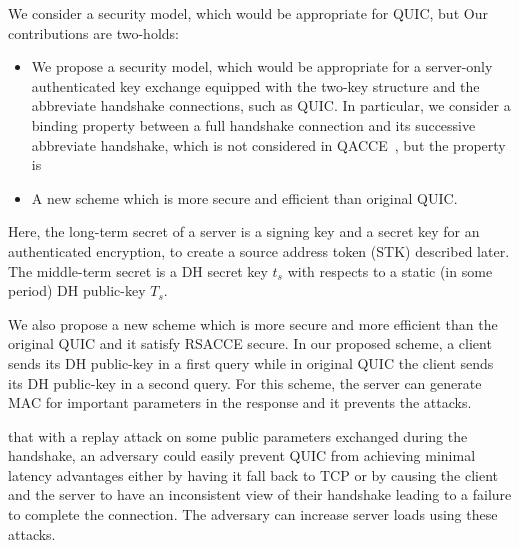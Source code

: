 We consider a security model, which would be appropriate for QUIC, but
Our contributions are two-holds:
\begin{itemize}
 \item{
 We propose a security model, which would be appropriate for a server-only authenticated key exchange
 equipped with the two-key structure and the abbreviate handshake connections, such as QUIC.
 In particular, we consider a binding property between a full handshake connection
 and its successive abbreviate handshake, which is not considered in QACCE~\cite{LJBN15:QUIC}, but
 the property is
 }

 \item{A new scheme which is more secure and efficient
 than original QUIC.}
\end{itemize}



Here, the long-term secret of a server is a signing key and
a secret key for an authenticated encryption, to create a source address token (STK)
described later. The middle-term secret is a DH secret key $t_s$ with respects to a static (in some period)
DH public-key $T_s$.


We also propose a new scheme which is more secure and more efficient
than the original QUIC and it satisfy RSACCE secure.
In our proposed scheme, a client sends its DH public-key in
a first query while in original QUIC the client sends its DH
public-key in a second query.
For this scheme, the server can generate MAC for important parameters in the
response and it prevents the attacks.


that with a replay attack on some
public parameters exchanged during the handshake, an
adversary could easily prevent QUIC from achieving
minimal latency advantages either by having it fall back
to TCP or by causing the client and the server to have an
inconsistent view of their handshake leading to a failure
to complete the connection.
The adversary can increase server loads using
these attacks.

